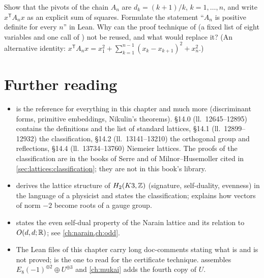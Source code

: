\begin{exercise}\label{ex:lattices:An}
Show that the pivots of the chain $A_n$ are $d_k=(k+1)/k$, $k=1,\dots,n$, and write
$x^{\mathsf T}A_nx$ as an explicit sum of squares. Formulate the statement ``$A_n$ is
positive definite for every $n$'' in Lean. Why can the proof technique of
 (a fixed list of eight variables and one call of ) not be
reused, and what would replace it? (An alternative identity:
$x^{\mathsf T}A_nx=x_1^2+\sum_{k=1}^{n-1}(x_k-x_{k+1})^2+x_n^2$.)
\end{exercise}

\section*{Further reading}

\begin{itemize}[leftmargin=*,itemsep=2pt]
\item {} is the reference for everything in this chapter
 and much more (discriminant forms, primitive embeddings, Nikulin's theorems). §14.0
 (ll.~12645--12895) contains the definitions and the list of standard lattices, §14.1
 (ll.~12899--12932) the classification, §14.2 (ll.~13141--13210) the orthogonal group and
 reflections, §14.4 (ll.~13734--13760) Niemeier lattices. The proofs of the classification
 are in the books of Serre and of Milnor--Husemoller cited in
 \cref{sec:lattices:classification}; they are not in this book's library.
\item {} derives the lattice structure of $H_2(K3,\mathbb{Z})$ (signature,
 self-duality, evenness) in the language of a physicist and states the classification;
  explains how vectors of norm $-2$ become roots of a gauge
 group.
\item {} states the even self-dual property of the Narain lattice
 and its relation to $O(d,d;\mathbb{R})$; see \cref{ch:narain,ch:odd}.
\item The Lean files of this chapter carry long doc-comments stating what is and is not
 proved;  is the one to read for the certificate technique.
  assembles $E_8(-1)^{\oplus2}\oplus U^{\oplus3}$ and \cref{ch:mukai} adds
 the fourth copy of $U$.
\end{itemize}
